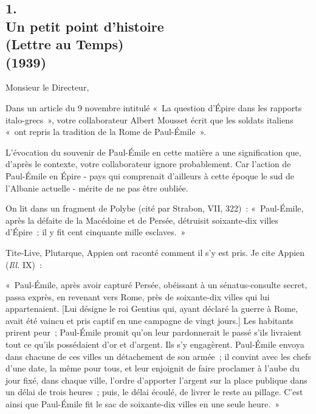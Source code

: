 \documentclass[french,twoside]{book} %
\begin{document}
\subsection[{1. Un petit point d'histoire, (Lettre au Temps)  (1939)}]{1. \\
Un petit point d'histoire \\
(Lettre au Temps) \protect\footnotemark {\itshape  }\\
(1939)}
\noindent \par
Monsieur le Directeur,\par
Dans un article du 9 novembre intitulé « La question d'Épire dans les rapports italo-grecs », votre collaborateur Albert Mousset écrit que les soldats italiens « ont repris la tradition de la Rome de Paul-Émile ».\par
L'évocation du souvenir de Paul-Émile en cette matière a une signification que, d'après le contexte, votre collaborateur ignore probablement. Car l’action de Paul-Émile en Épire - pays qui comprenait d'ailleurs à cette époque le sud de l'Albanie actuelle - mérite de ne pas être oubliée.\par
On lit dans un fragment de Polybe (cité par Strabon, VII, 322) : « Paul-Émile, après la défaite de la Macédoine et de Persée, détruisit soixante-dix villes d'Épire ; il y fit cent cinquante mille esclaves. »\par
Tite-Live, Plutarque, Appien ont raconté comment il s'y est pris. Je cite Appien ({\itshape Ill.} IX) :\par
« Paul-Émile, après avoir capturé Persée, obéissant à un sénatus-consulte secret, passa exprès, en revenant vers Rome, près de soixante-dix villes qui lui appartenaient. [Lui désigne le roi Gentius qui, ayant déclaré la guerre à Rome, avait été vaincu et pris captif en une campagne de vingt jours.] Les habitants prirent peur ; Paul-Émile promit qu'on leur pardonnerait le passé s'ils livraient tout ce qu'ils possédaient d'or et d'argent. Ils s'y engagèrent. Paul-Émile envoya dans chacune de ces villes un détachement de son armée ; il convint avec les chefs d'une date, la même pour tous, et leur enjoignit de faire proclamer à l'aube du jour fixé, dans chaque ville, l'ordre d'apporter l'argent sur la place publique dans un délai de trois heures ; puis, le délai écoulé, de livrer le reste au pillage. C'est ainsi que Paul-Émile fit le sac de soixante-dix villes en une seule heure. »\par
\end{document}
